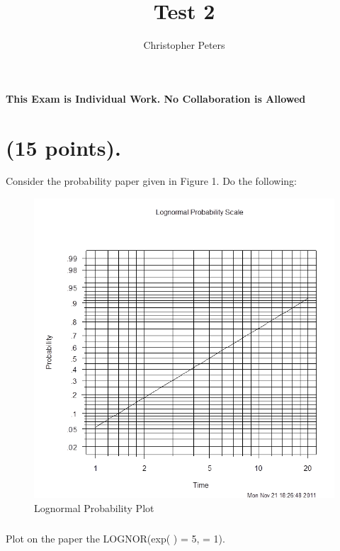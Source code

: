 \documentclass{article}
\begin{document}
\title{Test 2}
\author{Christopher Peters}
\maketitle

{\bf This Exam is Individual Work. No Collaboration is Allowed}\\
\section{(15 points).}
Consider the probability paper given in Figure 1. Do the following:\\

\begin{figure}
  \includegraphics[width = 5in]{lognormal_graph_1.png}
  \caption{Lognormal Probability Plot}
\end{figure}

\subsubsection{} 
Plot on the paper the LOGNOR(exp( \mu ) = 5, \sigma = 1).
\end{document}
